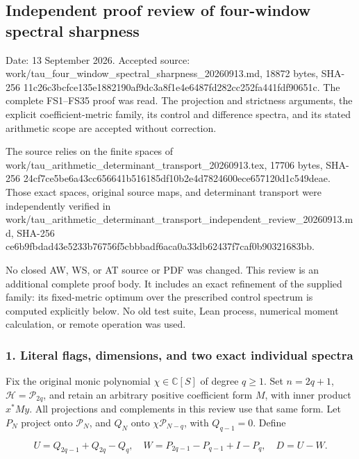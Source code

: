 \subsection{Independent proof review of four-window spectral sharpness}\label{endpoint-four_window_sharpness_review--independent-proof-review-of-four-window-spectral-sharpness}

Date: 13 September 2026. Accepted source: work/tau\_four\_window\_spectral\_sharpness\_20260913.md, 18872 bytes, SHA-256 11c26c3bcfce135e1882190af9dc3a8f1e4e6487fd282cc252fa441fdf90651c. The complete FS1--FS35 proof was read. The projection and strictness arguments, the explicit coefficient-metric family, its control and difference spectra, and its stated arithmetic scope are accepted without correction.

The source relies on the finite spaces of work/tau\_arithmetic\_determinant\_transport\_20260913.tex, 17706 bytes, SHA-256 24cf7ce5be6a43cc656641b516185df10b2e4d7824600ece657120d1c549deae. Those exact spaces, original source maps, and determinant transport were independently verified in work/tau\_arithmetic\_determinant\_transport\_independent\_review\_20260913.md, SHA-256 ce6b9fbdad43e5233b76756f5cbbbadf6aca0a33db62437f7caf0b90321683bb.

No closed AW, WS, or AT source or PDF was changed. This review is an additional complete proof body. It includes an exact refinement of the supplied family: its fixed-metric optimum over the prescribed control spectrum is computed explicitly below. No old test suite, Lean process, numerical moment calculation, or remote operation was used.

\subsubsection{1. Literal flags, dimensions, and two exact individual spectra}\label{endpoint-four_window_sharpness_review--literal-flags-dimensions-and-two-exact-individual-spectra}

Fix the original monic polynomial \(\chi\in\mathbb C[S]\) of degree \(q\ge1\). Set \(n=2q+1\), \(\mathcal H=\mathcal P_{2q}\), and retain an arbitrary positive coefficient form \(M\), with inner product \(x^*My\). All projections and complements in this review use that same form. Let \(P_N\) project onto \(\mathcal P_N\), and \(Q_N\) onto \(\chi\mathcal P_{N-q}\), with \(Q_{q-1}=0\). Define

\[
U=Q_{2q-1}+Q_{2q}-Q_q,\quad
W=P_{2q-1}-P_{q-1}+I-P_q,\quad D=U-W.
\tag{SR1}
\]

